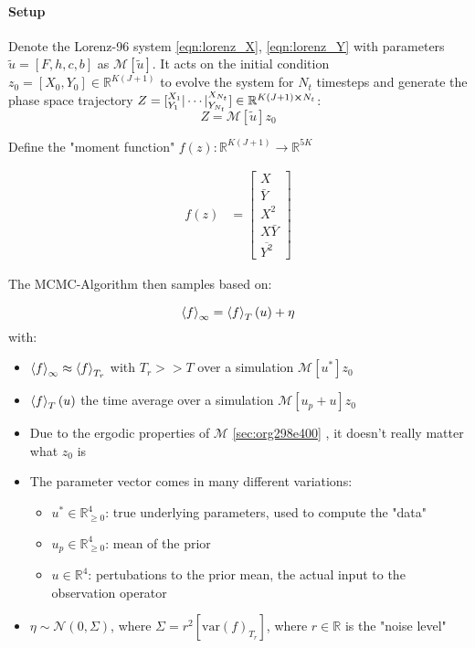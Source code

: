 \documentclass[11pt]{article}
\newcommand{\R}{{\mathbb{R}}}
\newcommand{\N}[2]{\mathcal{N}\left(#1,#2\right)}
\begin{document}
\paragraph{Setup}
\label{sec:orgd3294b3}
Denote the Lorenz-96 system \ref{eqn:lorenz_X}, \ref{eqn:lorenz_Y} with parameters \(\tilde{u} = [F, h, c, b]\) as
\(\mathcal{M}[\tilde{u}]\). It acts on the initial condition \(z_0 = [X_0, Y_0] \in \R^{K(J+1)}\) to evolve
the system for \(N_t\) timesteps and generate the phase space trajectory
\(Z = \left[ \smash{{}^{X_1}_{Y_1}} | \cdots | \smash{{}^{X_{N_t}}_{Y_{N_t}}}  \right] \in
   \R^{K(J+1) \cross N_t}\):
$$Z = \mathcal{M}[\tilde{u}] z_0$$

Define the "moment function" \(f(z): \R^{K(J+1)} \to \R^{5K}\)

\begin{align}
  f(z) &=
  \begin{bmatrix}
    X \\
    \bar{Y} \\
    X^2 \\
    X \bar{Y} \\
    \overline{Y^2}
  \end{bmatrix}
\end{align}

The MCMC-Algorithm then samples based on:

$$\expval{f}_\infty = \expval{f}_T(u) + \eta$$
with:
\begin{itemize}
\item \(\expval{f}_\infty \approx \expval{f}_{T_r}\) with \(T_r >> T\) over a simulation \(\mathcal{M}[u^*] z_0\)
\item \(\expval{f}_T(u)\) the time average over a simulation \(\mathcal{M}[u_p + u] z_0\)
\item Due to the ergodic properties of \(\mathcal{M}\) \ref{sec:org298e400} , it doesn't really matter what \(z_0\) is
\item The parameter vector comes in many different variations:
\begin{itemize}
\item \(u^* \in \R^4_{\geq 0}\): true underlying parameters, used to compute the "data"
\item \(u_p \in \R^4_{\geq 0}\): mean of the prior
\item \(u \in \R^4\): pertubations to the prior mean, the actual input to the observation operator
\end{itemize}
\item \(\eta \sim \N{0}{\Sigma}\), where \(\Sigma = r^2 [\text{var}(f)_{T_r}]\),
where \(r \in \R\) is the "noise level"
\end{itemize}
\end{document}
